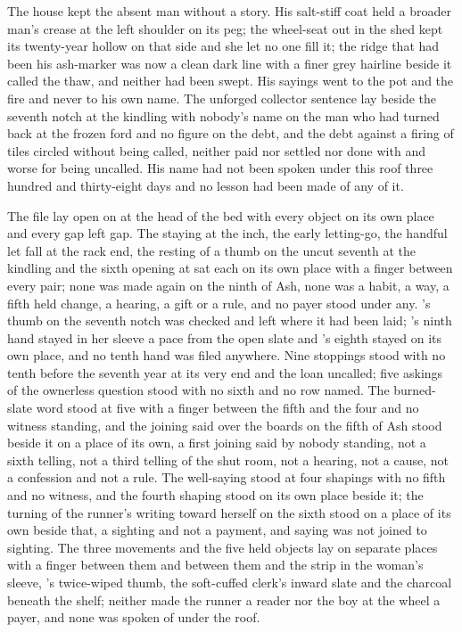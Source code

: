 The house kept the absent man without a story. His salt-stiff coat held a broader man's crease at the left shoulder on its peg; the wheel-seat out in the shed kept its twenty-year hollow on that side and she let no one fill it; the ridge that had been his ash-marker was now a clean dark line with a finer grey hairline beside it called the thaw, and neither had been swept. His sayings went to the pot and the fire and never to his own name. The unforged collector sentence lay beside the seventh notch at the kindling with nobody's name on the man who had turned back at the frozen ford and no figure on the debt, and the debt against a firing of tiles circled without being called, neither paid nor settled nor done with and worse for being uncalled. His name had not been spoken under this roof three hundred and thirty-eight days and no lesson had been made of any of it.

\scenebreak

The file lay open on  at the head of the bed with every object on its own place and every gap left gap. The staying at the inch, the early letting-go, the handful let fall at the rack end, the resting of a thumb on the uncut seventh at the kindling and the sixth opening at  sat each on its own place with a finger between every pair; none was made again on the ninth of Ash, none was a habit, a way, a fifth held change, a hearing, a gift or a rule, and no payer stood under any. 's thumb on the seventh notch was checked and left where it had been laid; 's ninth hand stayed in her sleeve a pace from the open slate and 's eighth stayed on its own place, and no tenth hand was filed anywhere. Nine stoppings stood with no tenth before the seventh year at its very end and the loan uncalled; five askings of the ownerless question stood with no sixth and no row named. The burned-slate word stood at five with a finger between the fifth and the four and no witness standing, and the joining said over the boards on the fifth of Ash stood beside it on a place of its own, a first joining said by nobody standing, not a sixth telling, not a third telling of the shut room, not a hearing, not a cause, not a confession and not a rule. The well-saying stood at four shapings with no fifth and no witness, and the fourth shaping stood on its own place beside it; the turning of the runner's writing toward herself on the sixth stood on a place of its own beside that, a sighting and not a payment, and saying was not joined to sighting. The three movements and the five held objects lay on separate places with a finger between them and between them and the strip in the woman's sleeve, 's twice-wiped thumb, the soft-cuffed clerk's inward slate and the charcoal beneath the shelf; neither made the runner a reader nor the boy at the wheel a payer, and none was spoken of under the roof.

